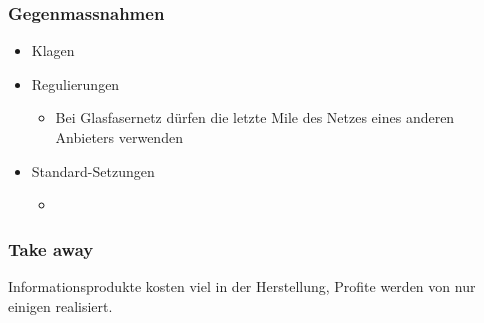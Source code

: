 \subsubsection{Gegenmassnahmen}

\begin{itemize}
    \item Klagen
    \item Regulierungen
    \begin{itemize}
        \item Bei Glasfasernetz dürfen die letzte Mile des Netzes eines anderen Anbieters verwenden
    \end{itemize}
    \item Standard-Setzungen
    \begin{itemize}
        \item 
    \end{itemize}
\end{itemize}

\subsubsection{Take away}
Informationsprodukte kosten viel in der Herstellung, Profite werden von nur einigen realisiert.